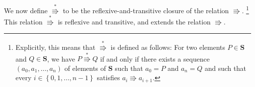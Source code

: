 \documentclass[numbers=enddot,12pt,final,onecolumn,notitlepage]{scrartcl}%
\theoremstyle{definition}
\newenvironment{proof}[1][Proof]{\noindent\textbf{#1.} }{\ \rule{0.5em}{0.5em}}
\begin{document}





We now define $\overset{\ast}{\Rrightarrow}$ to be the
reflexive-and-transitive closure of the relation $\Rrightarrow$.
\footnote{Explicitly, this means that $\overset{\ast}{\Rrightarrow}$
is defined as follows: For two elements $P\in\mathbf{S}$ and $Q\in\mathbf{S}$,
we have $P\overset{\ast}{\Rrightarrow}Q$ if and only if there exists a
sequence $\left(  a_{0},a_{1},\ldots,a_{n}\right)  $ of elements of
$\mathbf{S}$ such that $a_{0}=P$ and $a_{n}=Q$ and such that every
$i\in\left\{  0,1,\ldots,n-1\right\}  $ satisfies $a_{i}\Rrightarrow a_{i+1}%
$.} This relation $\overset{\ast}{\Rrightarrow}$ is reflexive and transitive,
and extends the relation $\Rrightarrow$.
\end{document}
